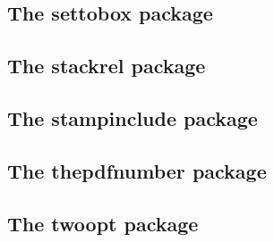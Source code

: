 \documentclass[a4paper,12pt]{article}
\makeatletter
\newcommand*{\xpackage}[1]{\textsf{#1}}
\newcommand*{\xext}[1]{\texttt{.#1}}
\newcommand*{\cs}[1]{\texttt{\textbackslash#1}}
\newcommand*{\tocinclude}[1]{%
  \setcounter{tocdepth}{3}%
  \begingroup
    \makeatletter
    \def\@prj{#1}%
    \let\contentsline\foreign@contentsline
  \endgroup
}
\def\foreign@contentsline#1#2#3#4{%
  \ifx\\#4\\%
    \csname l@#1\endcsname{#2}{#3}%
  \else
    \ifHy@linktocpage
      \csname l@#1\endcsname{{#2}}{%
        \hyper@linkfile{#3}{\@prj.pdf}{#4}%
      }%
    \else
      \csname l@#1\endcsname{%
        \hyper@linkfile{#2}{\@prj.pdf}{#4}%
      }{#3}%
    \fi
  \fi
}%
\newcommand*{\pkgsectformat}[1]{%
  \texorpdfstring{%
    \textcolor{link}{The} %
    \xpackage{#1} %
    \textcolor{link}{package}%
  }{#1}%
}
\makeatother
\begin{document}
\newpage
\subsection{\pkgsectformat{settobox}}
\label{settobox}
\begin{abstract}
Commands are defined for getting box sizes similar
to \LaTeX's \cs{settowidth} commands.
\end{abstract}
\tocinclude{settobox}

\newpage
\subsection{\pkgsectformat{stackrel}}
\label{stackrel}
\begin{abstract}
This package adds an optional argument to \cs{stackrel} for
putting something below the relational symbol and defines
\cs{stackbin} for binary symbols.
\end{abstract}
\tocinclude{stackrel}

\newpage
\subsection{\pkgsectformat{stampinclude}}
\label{stampinclude}
\begin{abstract}
The package replaces \cs{includeonly} and selects the files for
\cs{include} by inspecting the time stamp of the \xext{aux} file.
The file is selected for inclusion if the \xext{aux} file does
not yet exist or is older than the corresponding \xext{tex} file.
\end{abstract}
\tocinclude{stampinclude}

\newpage
\subsection{\pkgsectformat{thepdfnumber}}
\label{thepdfnumber}
\begin{abstract}
The package converts real numbers to a minimal representation
that is stripped from leading or trailing zeros,
plus signs and decimal point if not necessary.
\end{abstract}
\tocinclude{thepdfnumber}


\newpage
\subsection{\pkgsectformat{twoopt}}
\label{twoopt}
\begin{abstract}
This package provides commands to define macros with two
optional arguments.
\end{abstract}
\tocinclude{twoopt}
\end{document}
